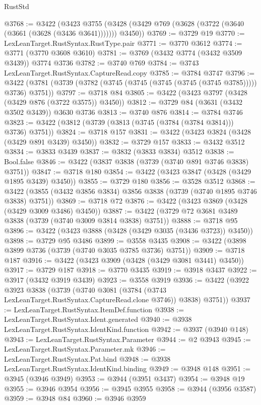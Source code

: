 \begin{lexlean}{RustStd}
\begin{coremodule}
@3768 := @3422
    (@3423 @3755 (@3428 (@3429 @769 (@3628 (@3722 (@3640 (@3661 (@3628 (@3436 @3641))))))) @3450))
@3769 := @3729 @19
@3770 := LexLeanTarget.RustSyntax.RustType.pair
@3771 := @3770 @3612
@3774 := @3771 (@3770 @3608 @3610)
@3781 := @3769 (@3432 @3774 (@3432 @3509 @3439)) @3774 @3736
@3782 := @3740 @769
@3784 := @3743 LexLeanTarget.RustSyntax.CaptureRead.copy
@3785 := @3784 @3747
@3796 := @3422 (@3781 (@3739 (@3782 (@3745 (@3745 (@3745 (@3745 (@3745 @3785))))) @3736) @3751))
@3797 := @3718 @84
@3805 := @3422 (@3423 @3797 (@3428 (@3429 @876 (@3722 @3575)) @3450))
@3812 := @3729 @84 (@3631 (@3432 @3502 @3439)) @3630 @3736
@3813 := @3740 @876
@3814 := @3784 @3746
@3823 := @3422 (@3812 (@3739 (@3813 (@3745 (@3784 (@3784 @3814))) @3736) @3751))
@3824 := @3718 @157
@3831 := @3422 (@3423 @3824 (@3428 (@3429 @891 @3439) @3450))
@3832 := @3729 @157
@3833 := @3432 @3512
@3834 := @3833 @3439
@3837 := @3832 (@3833 @3834) @3512
@3838 := Bool.false
@3846 := @3422 (@3837 @3838 (@3739 (@3740 @891 @3746 @3838) @3751))
@3847 := @3718 @180
@3854 := @3422 (@3423 @3847 (@3428 (@3429 @1895 @3439) @3450))
@3855 := @3729 @180
@3856 := @3528 @3512
@3868 := @3422 (@3855 (@3432 @3856 @3834) @3856 @3838 (@3739 (@3740 @1895 @3746 @3838) @3751))
@3869 := @3718 @72
@3876 := @3422 (@3423 @3869 (@3428 (@3429 @3009 @3486) @3450))
@3887 := @3422 (@3729 @72 @3681 @3489 @3838 (@3739 (@3740 @3009 @3814 @3838) @3751))
@3888 := @3718 @95
@3896 := @3422 (@3423 @3888 (@3428 (@3429 @3035 (@3436 @3723)) @3450))
@3898 := @3729 @95 @3486
@3899 := @3558 @3435
@3908 := @3422 (@3898 @3899 @3736 (@3739 (@3740 @3035 @3785 @3736) @3751))
@3909 := @3718 @187
@3916 := @3422 (@3423 @3909 (@3428 (@3429 @3081 @3441) @3450))
@3917 := @3729 @187
@3918 := @3770 @3435
@3919 := @3918 @3437
@3922 := @3917 (@3432 @3919 @3439)
@3923 := @3558 @3919
@3936 := @3422
    (@3922
      @3923
      @3838
      (@3739
        (@3740 @3081 (@3784 (@3743 LexLeanTarget.RustSyntax.CaptureRead.clone @3746)) @3838)
        @3751))
@3937 := LexLeanTarget.RustSyntax.ItemDef.function
@3938 := LexLeanTarget.RustSyntax.Ident.generated
@3940 := @3938 LexLeanTarget.RustSyntax.IdentKind.function
@3942 := @3937 (@3940 @148)
@3943 := LexLeanTarget.RustSyntax.Parameter
@3944 := @2 @3943
@3945 := LexLeanTarget.RustSyntax.Parameter.mk
@3946 := LexLeanTarget.RustSyntax.Pat.bind
@3948 := @3938 LexLeanTarget.RustSyntax.IdentKind.binding
@3949 := @3948 @148
@3951 := @3945 (@3946 @3949)
@3953 := @3944 (@3951 @3437)
@3954 := @3948 @19
@3955 := @3946 @3954
@3956 := @3945 @3955
@3958 := @3944 (@3956 @3587)
@3959 := @3948 @84
@3960 := @3946 @3959

\end{coremodule}
\end{lexlean}
